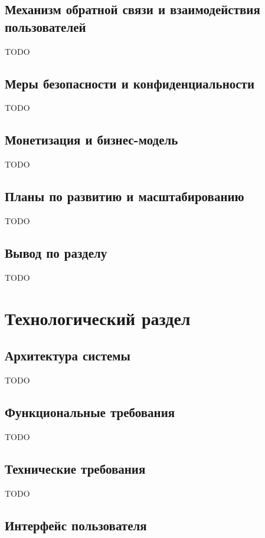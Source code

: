 \documentclass{mirea-prog-lang}
\begin{document}
\subsection{Механизм обратной связи и взаимодействия пользователей}

TODO

\subsection{Меры безопасности и конфиденциальности}

TODO

\subsection{Монетизация и бизнес-модель}

TODO

\subsection{Планы по развитию и масштабированию}

TODO

\subsection*{Вывод по разделу}

TODO

\section{Технологический раздел}

\subsection{Архитектура системы}

TODO

\subsection{Функциональные требования}

TODO

\subsection{Технические требования}

TODO

\subsection{Интерфейс пользователя}
\end{document}
